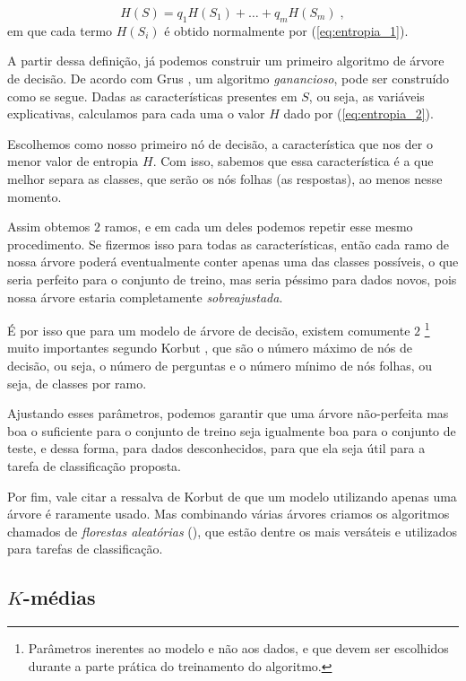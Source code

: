 \begin{equation}\label{eq:entropia_2}
H(S) = q_1 H(S_1) + \ldots + q_m H(S_m) \; ,
\end{equation}
em que cada termo $H(S_i)$ é obtido normalmente por (\ref{eq:entropia_1}).

A partir dessa definição, já podemos construir um primeiro algoritmo de árvore de decisão. De acordo com Grus \citep{data}, um algoritmo \emph{ganancioso}, pode ser construído como se segue. Dadas as características presentes em $S$, ou seja, as variáveis explicativas, calculamos para cada uma o valor $H$ dado por (\ref{eq:entropia_2}).

Escolhemos como nosso primeiro nó de decisão, a característica que nos der o menor valor de entropia $H$. Com isso, sabemos que essa característica é a que melhor separa as classes, que serão os nós folhas (as respostas), ao menos nesse momento.

Assim obtemos $2$ ramos, e em cada um deles podemos repetir esse mesmo procedimento. Se fizermos isso para todas as características, então cada ramo de nossa árvore poderá eventualmente conter apenas uma das classes possíveis, o que seria perfeito para o conjunto de treino, mas seria péssimo para dados novos, pois nossa árvore estaria completamente \emph{sobreajustada}.

É por isso que para um modelo de árvore de decisão, existem comumente $2$ \footnote{Parâmetros inerentes ao modelo e não aos dados, e que devem ser escolhidos durante a parte prática do treinamento do algoritmo.} muito importantes segundo Korbut \citep{korbut}, que são o número máximo de nós de decisão, ou seja, o número de perguntas e o número mínimo de nós folhas, ou seja, de classes por ramo.

Ajustando esses parâmetros, podemos garantir que uma árvore não-perfeita mas boa o suficiente para o conjunto de treino seja igualmente boa para o conjunto de teste, e dessa forma, para dados desconhecidos, para que ela seja útil para a tarefa de classificação proposta.

Por fim, vale citar a ressalva de Korbut \citep{korbut} de que um modelo utilizando apenas uma árvore é raramente usado. Mas combinando várias árvores criamos os algoritmos chamados de \emph{florestas aleatórias} (), que estão dentre os mais versáteis e utilizados para tarefas de classificação.

\subsection{$K$-médias}

